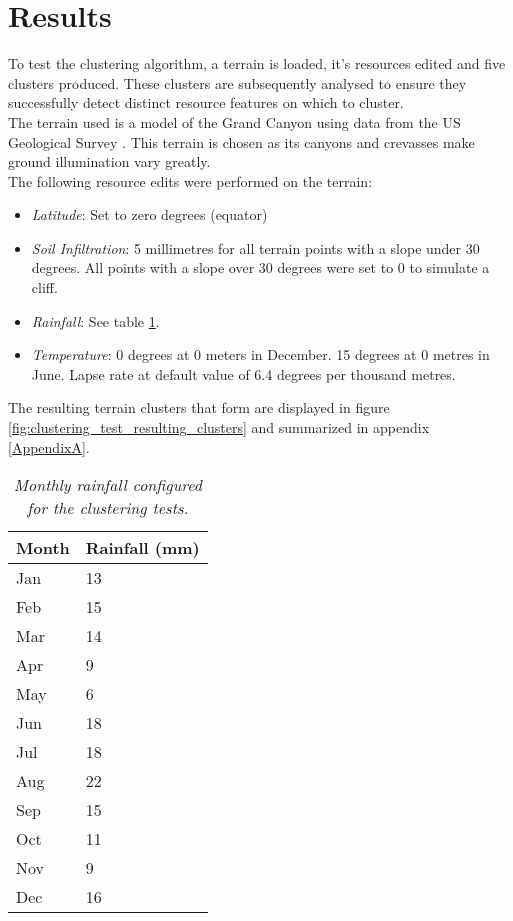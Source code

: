 \section{Results}

To test the clustering algorithm, a terrain is loaded, it's resources edited and five clusters produced. These clusters are subsequently analysed to ensure they successfully detect distinct resource features on which to cluster.\\

The terrain used is a model of the Grand Canyon using data from the US Geological Survey \protect\footnotemark {}. This terrain is chosen as its canyons and crevasses make ground illumination vary greatly.\\

The following resource edits were performed on the terrain:

\begin{itemize}
\item \textit{Latitude}: Set to zero degrees (equator)
\item \textit{Soil Infiltration}: 5 millimetres for all terrain points with a slope under 30 degrees. All points with a slope over 30 degrees were set to 0 to simulate a cliff.
\item \textit{Rainfall}: See table \ref{tab:clustering_test_rainfall}.
\item \textit{Temperature}: 0 degrees at 0 meters in December. 15 degrees at 0 metres in June. Lapse rate at default value of 6.4 degrees per thousand metres.
\end{itemize}

The resulting terrain clusters that form are displayed in figure \ref{fig:clustering_test_resulting_clusters} and summarized in appendix \ref{AppendixA}.

\begin{table}[]
  \centering
	    \begin{tabular}{|p{5cm}|p{5cm}|}
	    \hline
	    \textbf{Month} & \textbf{Rainfall (mm)}\\
		\hline
	    Jan & 13 \\
	    \hline
	    Feb & 15 \\
	    \hline
	    Mar & 14 \\
	    \hline
	    Apr & 9 \\
	    \hline
	    May & 6 \\
	    \hline
	    Jun & 18 \\
	    \hline
	    Jul & 18 \\
	    \hline
	    Aug & 22 \\
	    \hline
	    Sep & 15 \\
	    \hline
	    Oct & 11 \\
	    \hline
	    Nov & 9 \\
	    \hline
	    Dec & 16 \\
	    \hline
		\end{tabular}
		\caption{\textit{Monthly rainfall configured for the clustering tests.}}
	  \label{tab:clustering_test_rainfall}
\end{table}

